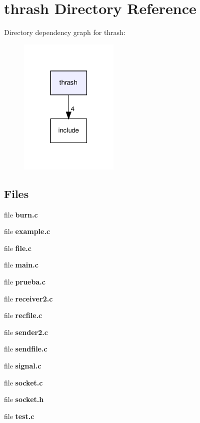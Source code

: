 \section{thrash Directory Reference}
\label{dir_c379293c836f304268e92f9c3073abed}
Directory dependency graph for thrash\+:\nopagebreak
\begin{figure}[H]
\begin{center}
\leavevmode
\includegraphics[width=134pt]{dir_c379293c836f304268e92f9c3073abed_dep}
\end{center}
\end{figure}
\subsection*{Files}
\begin{DoxyCompactItemize}
\item 
file \textbf{ burn.\+c}
\item 
file \textbf{ example.\+c}
\item 
file \textbf{ file.\+c}
\item 
file \textbf{ main.\+c}
\item 
file \textbf{ prueba.\+c}
\item 
file \textbf{ receiver2.\+c}
\item 
file \textbf{ recfile.\+c}
\item 
file \textbf{ sender2.\+c}
\item 
file \textbf{ sendfile.\+c}
\item 
file \textbf{ signal.\+c}
\item 
file \textbf{ socket.\+c}
\item 
file \textbf{ socket.\+h}
\item 
file \textbf{ test.\+c}
\end{DoxyCompactItemize}
